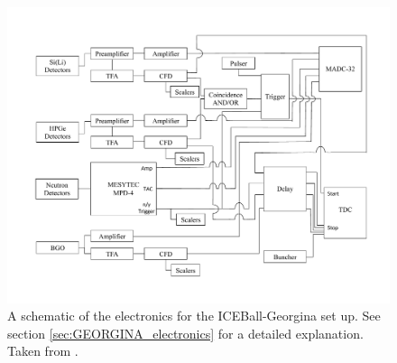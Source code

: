 \begin{figure}
    \centering
    \includegraphics[scale=0.5]{Setup_Figs/electronics-diagram.pdf}
    \caption{A schematic of the electronics for the ICEBall-Georgina set up. See section \ref{sec:GEORGINA_electronics} for a detailed explanation. Taken from \citep{battaglia15:_iceball_176lu}.}
    \label{fig:iceball_electronics}
\end{figure}